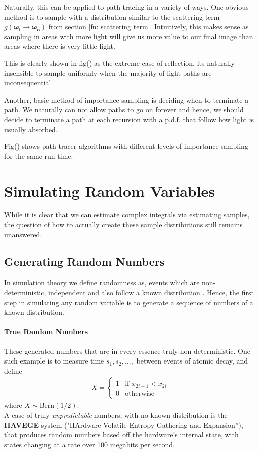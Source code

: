 \documentclass{article}
\begin{document}
Naturally, this can be applied to path tracing in a variety of ways. 
One obvious method is to sample with a distribution similar to the scattering term
$g(\boldsymbol{\omega_i}\rightarrow\boldsymbol{\omega_o})$ from section \ref{fn: scattering term}. 
Intuitively, this makes sense as sampling in areas with more light will give us more value to our final
image than areas where there is very little light.

This is clearly shown in fig() as the extreme case of reflection, its naturally insensible to sample
uniformly when the majority of light paths are inconsequential.

Another, basic method of importance sampling is deciding when to terminate a path. 
We naturally can not allow paths to go on forever and hence, we should decide to terminate a path at each recursion 
with a p.d.f. that follow how light is usually absorbed. 

Fig() shows path tracer algorithms with different levels of importance sampling for the same run time.

\section{Simulating Random Variables}

While it is clear that we can estimate complex integrals via estimating samples, 
the question of how to actually create these sample distributions still remains 
unanswered.

\subsection{Generating Random Numbers}

In simulation theory we define randomness as, events which are non-deterministic, independent 
and also follow a known distribution \cite{shiryaev2016probability}. 
Hence, the first step in simulating any random variable is to generate a sequence of numbers 
of a known distribution. 

\paragraph{True Random Numbers}
These generated numbers that are in every essence truly non-deterministic.
One such example is to measure time $s_1,s_2,\dots,$ between events of atomic decay, and define
\begin{align}
 X =
    \begin{cases} 
      1 & \text{if } x_{2i-1}<x_{2i} \\ 
      0 & \text{otherwise}
    \end{cases}
\end{align}
where $X \sim \text{Bern}(1/2)$.
\\
A case of truly \textit{unpredictable} numbers, with no known distribution
is the \textbf{HAVEGE} system ("HArdware Volatile Entropy Gathering and Expansion”)\label{point: HAVEGE},
that produces random numbers based off the hardware's internal state, with states changing
at a rate over 100 megabits per second. \cite{gentle2003random}
\end{document}

